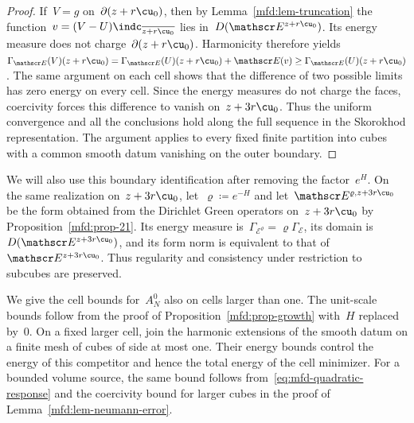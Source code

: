 \documentclass[11pt]{amsart}
\begin{document}
\begin{proof}
If~$V=g$ on~$\partial(z+r\cu_0)$, then by Lemma~\ref{mfd:lem-truncation} the function~$v=(V-U)\indc_{\overline{z+r\cu_0}}$ lies in~$D(\mathscr E^{z+r\cu_0})$. Its energy measure does not charge~$\partial(z+r\cu_0)$. Harmonicity therefore yields~$\Gamma_{\mathscr E}(V)(z+r\cu_0)=\Gamma_{\mathscr E}(U)(z+r\cu_0)+\mathscr E(v)\geq\Gamma_{\mathscr E}(U)(z+r\cu_0)$. The same argument on each cell shows that the difference of two possible limits has zero energy on every cell. Since the energy measures do not charge the faces, coercivity forces this difference to vanish on~$z+3r\cu_0$. Thus the uniform convergence and all the conclusions hold along the full sequence in the Skorokhod representation. The argument applies to every fixed finite partition into cubes with a common smooth datum vanishing on the outer boundary.
\end{proof}

We will also use this boundary identification after removing the factor~$e^H$. On the same realization on~$z+3r\cu_0$, let~$\varrho\coloneqq e^{-H}$ and let~$\mathscr E^{\varrho,z+3r\cu_0}$ be the form obtained from the Dirichlet Green operators on~$z+3r\cu_0$ by Proposition~\ref{mfd:prop-21}. Its energy measure is~$\Gamma_{\mathscr E^\varrho}=\varrho\Gamma_{\mathscr E}$, its domain is~$D(\mathscr E^{z+3r\cu_0})$, and its form norm is equivalent to that of~$\mathscr E^{z+3r\cu_0}$. Thus regularity and consistency under restriction to subcubes are preserved.

\smallskip

We give the cell bounds for~$A_N^0$ also on cells larger than one. The unit-scale bounds follow from the proof of Proposition~\ref{mfd:prop-growth} with~$H$ replaced by~$0$. On a fixed larger cell, join the harmonic extensions of the smooth datum on a finite mesh of cubes of side at most one. Their energy bounds control the energy of this competitor and hence the total energy of the cell minimizer. For a bounded volume source, the same bound follows from~\eqref{eq:mfd-quadratic-response} and the coercivity bound for larger cubes in the proof of Lemma~\ref{mfd:lem-neumann-error}.

\smallskip
\end{document}
